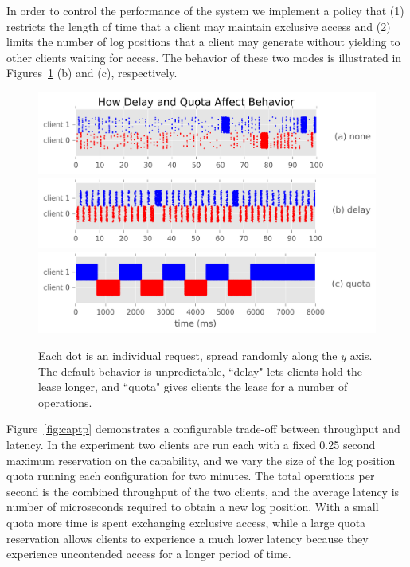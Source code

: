 \documentclass[preprint]{sigplanconf-eurosys}
\begin{document}
In order to control the performance of the system we implement a
policy that (1) restricts the length of time that a client may maintain
exclusive access and (2) limits the number of log positions that a client may
generate without yielding to other clients waiting for access. The behavior of
these two modes is illustrated in Figures~\ref{fig:capdelay-quota-behavior}
(b) and (c), respectively.

\begin{figure}[tbp]
\centering
\includegraphics{figures/capdelay-quota-behavior-a.png}
\includegraphics{figures/capdelay-quota-behavior-b.png}
\includegraphics{figures/capdelay-quota-behavior-c.png}
\caption{Each dot is an individual request, spread randomly along the \(y\)
axis. The default behavior is unpredictable, ``delay" lets clients hold the
lease longer, and ``quota" gives clients the lease for a number of operations.}
\label{fig:capdelay-quota-behavior}
\end{figure}

Figure~\ref{fig:captp} demonstrates a configurable trade-off between
throughput and latency. In the experiment two clients are run each with a
fixed 0.25 second maximum reservation on the capability, and we vary the size
of the log position quota running each configuration for two minutes. The
total operations per second is the combined throughput of the two clients, and
the average latency is number of microseconds required to obtain a new log
position. With a small quota more time is spent exchanging exclusive access,
while a large quota reservation allows clients to experience a much lower
latency because they experience uncontended access for a longer period of time.
\end{document}
